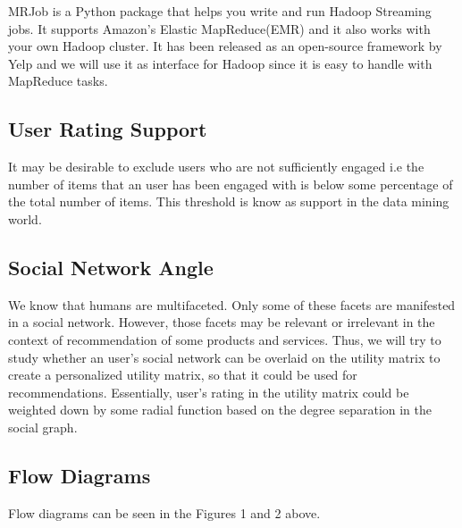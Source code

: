 \documentclass[12pt]{article} %
\begin{document}
MRJob is a Python package that helps you write and run Hadoop Streaming jobs. It supports Amazon's Elastic MapReduce(EMR) and it also works with your own Hadoop cluster.  It has been released as an open-source framework by Yelp and we will use it as interface for Hadoop since it is easy to handle with MapReduce tasks.

\subsection{User Rating Support}

It may be desirable to exclude users who are not sufficiently engaged i.e the number of items that an user has been engaged with is below some percentage of the total number of items. This threshold is know as support in the data mining world. 

\subsection{Social Network Angle}

We know that humans are multifaceted. Only some of these facets are manifested in a social network. However, those facets may be relevant or irrelevant in the context of recommendation of some products and services. Thus, we will try to study whether an user's social network can be overlaid on the  utility matrix to create a personalized utility matrix, so that it could be used for recommendations.  Essentially, user's rating in the utility matrix could be weighted down by some radial function based on the degree separation in the social graph. 

\subsection{Flow Diagrams}

Flow diagrams can be seen in the Figures 1 and 2 above.
\end{document}
